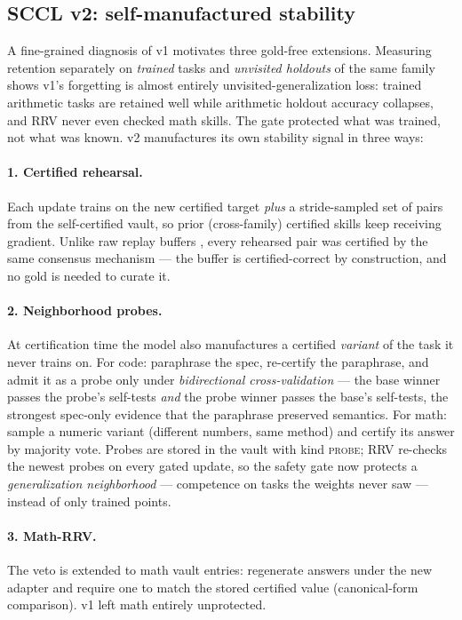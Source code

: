 \documentclass[10pt,conference]{IEEEtran}
\begin{document}
\subsection{SCCL v2: self-manufactured stability}
\label{sec:v2}
A fine-grained diagnosis of v1 motivates three gold-free extensions. Measuring retention separately on \emph{trained} tasks and \emph{unvisited holdouts} of the same family shows v1's forgetting is almost entirely unvisited-generalization loss: trained arithmetic tasks are retained well while arithmetic holdout accuracy collapses, and RRV never even checked math skills. The gate protected what was trained, not what was known. v2 manufactures its own stability signal in three ways:

\paragraph{1. Certified rehearsal.} Each update trains on the new certified target \emph{plus} a stride-sampled set of pairs from the self-certified vault, so prior (cross-family) certified skills keep receiving gradient. Unlike raw replay buffers \cite{er,gem,agem}, every rehearsed pair was certified by the same consensus mechanism --- the buffer is certified-correct by construction, and no gold is needed to curate it.

\paragraph{2. Neighborhood probes.} At certification time the model also manufactures a certified \emph{variant} of the task it never trains on. For code: paraphrase the spec, re-certify the paraphrase, and admit it as a probe only under \emph{bidirectional cross-validation} --- the base winner passes the probe's self-tests \emph{and} the probe winner passes the base's self-tests, the strongest spec-only evidence that the paraphrase preserved semantics. For math: sample a numeric variant (different numbers, same method) and certify its answer by majority vote. Probes are stored in the vault with kind \textsc{probe}; RRV re-checks the newest probes on every gated update, so the safety gate now protects a \emph{generalization neighborhood} --- competence on tasks the weights never saw --- instead of only trained points.

\paragraph{3. Math-RRV.} The veto is extended to math vault entries: regenerate answers under the new adapter and require one to match the stored certified value (canonical-form comparison). v1 left math entirely unprotected.
\end{document}
